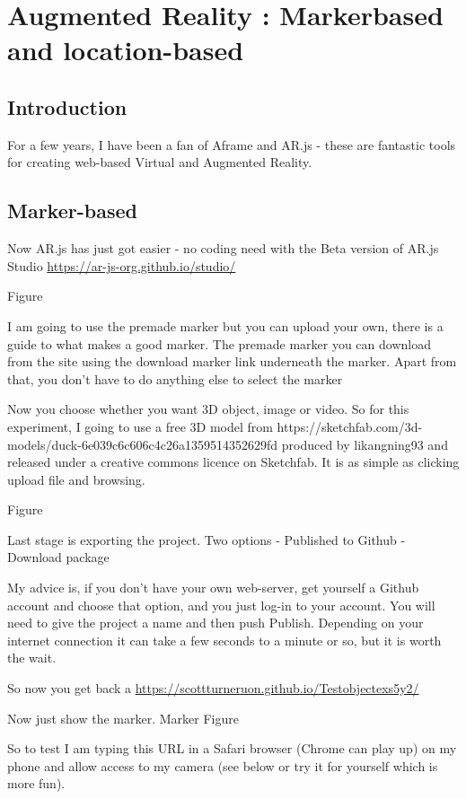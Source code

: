 \chapter{Augmented Reality : Markerbased and location-based}

\section{Introduction}
For a few years, I have been a fan of Aframe and AR.js - these are fantastic tools for creating web-based Virtual and Augmented Reality.

\section{Marker-based}
Now AR.js has just got easier - no coding need with the Beta version of AR.js Studio \url{https://ar-js-org.github.io/studio/}

Figure

I am going to use the premade marker but you can upload your own, there is a guide to what makes a good marker. The premade marker you can download from the site using the download marker link underneath the marker. Apart from that, you don't have to do anything else to select the marker

Now you choose whether you want 3D object, image or video. So for this experiment, I going to use a free 3D model from https://sketchfab.com/3d-models/duck-6e039c6c606c4c26a1359514352629fd produced by likangning93 and released under a creative commons licence on Sketchfab. It is as simple as clicking upload file and browsing.

Figure

Last stage is exporting the project. Two options 
- Published to Github 
- Download package

My advice is, if you don't have your own web-server, get yourself a Github account and choose that option, and you just log-in to your account. You will need to give the project a name and then push Publish. Depending on your internet connection it can take a few seconds to a minute or so, but it is worth the wait.

So now you get back a \url{https://scottturneruon.github.io/Testobjectexs5y2/} 

Now just show the marker.
Marker Figure

So to test I am typing this URL in a Safari browser (Chrome can play up) on my phone and allow access to my camera (see below or try it for yourself which is more fun).

